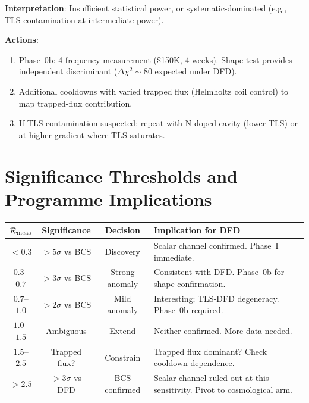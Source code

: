 \documentclass[11pt]{article}
\newcommand{\Rq}{\mathcal{R}}
\begin{document}
\begin{tcolorbox}[colback=yellow!5!white, colframe=orange!60!black,
  title=\textbf{OUTCOME C: AMBIGUOUS ($\Rq_{\rm meas} \in [0.5, 1.5]$
  with $<2\sigma$ discrimination)}]

\textbf{Interpretation}: Insufficient statistical power, or
systematic-dominated (e.g., TLS contamination at intermediate power).

\textbf{Actions}:
\begin{enumerate}[nosep]
\item Phase~0b: 4-frequency measurement (\$150K, 4 weeks). Shape
  test provides independent discriminant ($\Delta\chi^2 \sim 80$
  expected under DFD).
\item Additional cooldowns with varied trapped flux (Helmholtz coil
  control) to map trapped-flux contribution.
\item If TLS contamination suspected: repeat with N-doped cavity
  (lower TLS) or at higher gradient where TLS saturates.
\end{enumerate}
\end{tcolorbox}


\section{Significance Thresholds and Programme Implications}
\label{sec:significance}

\begin{center}
\renewcommand{\arraystretch}{1.4}
\begin{tabular}{@{}cccp{6cm}@{}}
\toprule
$\Rq_{\rm meas}$ & Significance & Decision &
\textbf{Implication for DFD} \\
\midrule
$< 0.3$ & $>5\sigma$ vs BCS & Discovery & Scalar channel confirmed.
Phase~I immediate. \\
$0.3$--$0.7$ & $>3\sigma$ vs BCS & Strong anomaly &
Consistent with DFD. Phase~0b for shape confirmation. \\
$0.7$--$1.0$ & $>2\sigma$ vs BCS & Mild anomaly &
Interesting; TLS-DFD degeneracy. Phase~0b required. \\
$1.0$--$1.5$ & Ambiguous & Extend & Neither confirmed. More data needed. \\
$1.5$--$2.5$ & Trapped flux? & Constrain & Trapped flux dominant?
Check cooldown dependence. \\
$> 2.5$ & $>3\sigma$ vs DFD & BCS confirmed & Scalar channel ruled
out at this sensitivity. Pivot to cosmological arm. \\
\bottomrule
\end{tabular}
\end{center}
\end{document}
